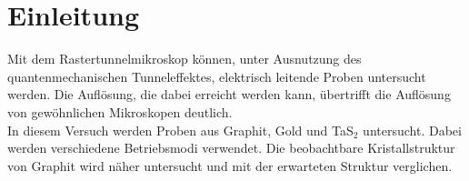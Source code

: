 \section{Einleitung}
Mit dem Rastertunnelmikroskop können, unter Ausnutzung des quantenmechanischen Tunneleffektes, elektrisch leitende Proben untersucht werden. Die Auflösung, die dabei erreicht werden kann, übertrifft die Auflösung von gewöhnlichen Mikroskopen deutlich.\\
In diesem Versuch werden Proben aus Graphit, Gold und TaS$_2$ untersucht. Dabei werden verschiedene Betriebsmodi verwendet. Die beobachtbare Kristallstruktur von Graphit wird näher untersucht und mit der erwarteten Struktur verglichen.  
